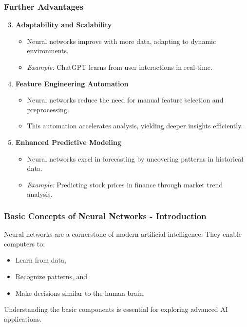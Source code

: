 \documentclass[aspectratio=169]{beamer}
\begin{document}
\begin{frame}[fragile]
    \frametitle{Further Advantages}
    \begin{enumerate}
        \setcounter{enumi}{2}
        \item \textbf{Adaptability and Scalability}
            \begin{itemize}
                \item Neural networks improve with more data, adapting to dynamic environments.
                \item \textit{Example:} ChatGPT learns from user interactions in real-time.
            \end{itemize}
        
        \item \textbf{Feature Engineering Automation}
            \begin{itemize}
                \item Neural networks reduce the need for manual feature selection and preprocessing.
                \item This automation accelerates analysis, yielding deeper insights efficiently.
            \end{itemize}
        
        \item \textbf{Enhanced Predictive Modeling}
            \begin{itemize}
                \item Neural networks excel in forecasting by uncovering patterns in historical data.
                \item \textit{Example:} Predicting stock prices in finance through market trend analysis.
            \end{itemize}
    \end{enumerate}
\end{frame}

\begin{frame}[fragile]
    \frametitle{Basic Concepts of Neural Networks - Introduction}
    Neural networks are a cornerstone of modern artificial intelligence. They enable computers to:
    \begin{itemize}
        \item Learn from data,
        \item Recognize patterns, and
        \item Make decisions similar to the human brain.
    \end{itemize}
    Understanding the basic components is essential for exploring advanced AI applications.
\end{frame}
\end{document}
